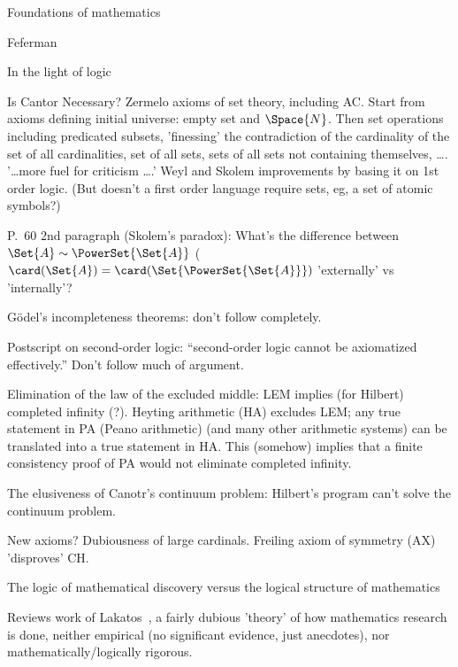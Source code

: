 \begin{plSection}{Foundations of mathematics}
\begin{plSection}{Feferman}
\begin{plSection}{In the light of logic}
\begin{plSection}{Is Cantor Necessary?}
Zermelo axioms of set theory, including AC.
Start from axioms defining initial universe:
empty set and $\Space{N}$.
Then set operations including predicated subsets,
'finessing' the contradiction of the
cardinality of the set of all cardinalities,
set of all sets,
sets of all sets not containing themselves, 
\ldots.
\hfill\break
'\ldots more fuel for criticism \ldots.'
Weyl and Skolem improvements by basing it on 1st order logic.
(But doesn't a first order language require sets,
eg, a set of atomic symbols?)

P.~$60$ $2$nd paragraph (Skolem's paradox):
\hfill\break
What's the difference between $\Set{A} \sim \PowerSet{\Set{A}}$ 
($\card(\Set{A})=\card(\Set{\PowerSet{\Set{A}}})$
 'externally' vs 'internally'?

\textsf{G\"{o}del's incompleteness theorems:}
don't follow completely.

\textsf{Postscript on second-order logic:}
``second-order logic cannot be axiomatized effectively.''
Don't follow much of argument.

\textsf{Elimination of the law of the excluded middle:}
\hfill\break
LEM implies (for Hilbert) completed infinity (?).
\hfill\break
Heyting arithmetic (HA) excludes LEM;
any true statement in PA (Peano arithmetic) 
(and many other arithmetic systems)
can be translated into
a true statement in HA.
\hfill\break
This (somehow) implies that a finite consistency proof
of PA would not eliminate completed infinity.

\textsf{The elusiveness of Canotr's continuum problem:}
\hfill\break
Hilbert's program can't solve the continuum problem.


\textsf{New axioms?}
\hfill\break
Dubiousness of large cardinals.
\hfill\break
Freiling axiom of 
symmetry (AX)~\cite{Freiling:1986:Symmetry,wiki:FreilingsAxiomOfSymmetry}
'disproves' CH.

\end{plSection}%
\begin{plSection}{The logic of mathematical discovery 
versus the logical structure of mathematics}
\label{sec:logic_of_mathematical_discovery}

\cite[ch.~3 ``The logic of mathematical discovery versus
the logical structure of mathematics'']{Feferman:1998:LightOfLogic}

Reviews work of Lakatos~\cite{Lakatos:1976:Proofs,Lakatos:1978:MSE},
a fairly dubious 'theory' of how mathematics research is done,
neither empirical (no significant evidence, just anecdotes),
nor mathematically/logically rigorous.


\end{plSection}
\end{plSection}
\end{plSection}
\end{plSection}
